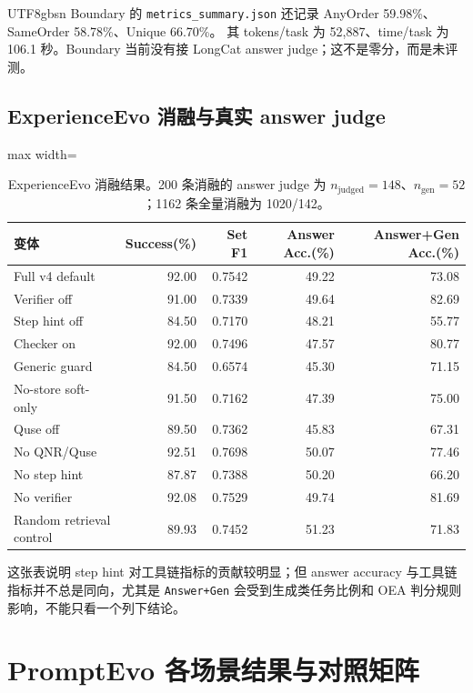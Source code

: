 \documentclass[a4paper,11pt]{article}
\begin{document}
\begin{CJK*}{UTF8}{gbsn}
Boundary 的 \texttt{metrics\_summary.json} 还记录 AnyOrder 59.98\%、SameOrder 58.78\%、Unique 66.70\%。
其 tokens/task 为 52,887、time/task 为 106.1 秒。Boundary 当前没有接 LongCat answer judge；这不是零分，而是未评测。

\subsection{ExperienceEvo 消融与真实 answer judge}

\begin{table}[H]
\centering
\scriptsize
\caption{ExperienceEvo 消融结果。200 条消融的 answer judge 为 $n_{\mathrm{judged}}=148$、$n_{\mathrm{gen}}=52$；1162 条全量消融为 1020/142。}
\begin{adjustbox}{max width=\textwidth}
\begin{tabular}{lrrrr}
\toprule
变体 & Success(\%) & Set F1 & Answer Acc.(\%) & Answer+Gen Acc.(\%)\\
\midrule
Full v4 default & 92.00 & 0.7542 & 49.22 & 73.08\\
Verifier off & 91.00 & 0.7339 & 49.64 & 82.69\\
Step hint off & 84.50 & 0.7170 & 48.21 & 55.77\\
Checker on & 92.00 & 0.7496 & 47.57 & 80.77\\
Generic guard & 84.50 & 0.6574 & 45.30 & 71.15\\
No-store soft-only & 91.50 & 0.7162 & 47.39 & 75.00\\
Quse off & 89.50 & 0.7362 & 45.83 & 67.31\\
\midrule
No QNR/Quse & 92.51 & 0.7698 & 50.07 & 77.46\\
No step hint & 87.87 & 0.7388 & 50.20 & 66.20\\
No verifier & 92.08 & 0.7529 & 49.74 & 81.69\\
Random retrieval control & 89.93 & 0.7452 & 51.23 & 71.83\\
\bottomrule
\end{tabular}
\end{adjustbox}
\end{table}

这张表说明 step hint 对工具链指标的贡献较明显；但 answer accuracy 与工具链指标并不总是同向，尤其是 \texttt{Answer+Gen} 会受到生成类任务比例和 OEA 判分规则影响，不能只看一个列下结论。

\section{PromptEvo 各场景结果与对照矩阵}


\end{CJK*}
\end{document}
